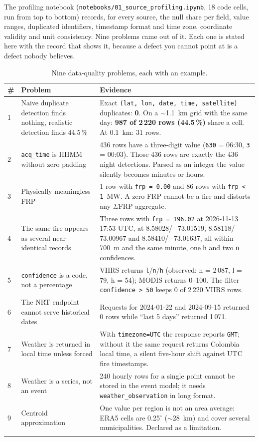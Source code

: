 \documentclass[11pt,a4paper]{article}
\newcommand{\code}[1]{\texttt{\small #1}}
\begin{document}
The profiling notebook (\code{notebooks/01\_source\_profiling.ipynb}, 18 code cells, run from top to
bottom) records, for every source, the null share per field, value ranges, duplicated identifiers,
timestamp format and time zone, coordinate validity and unit consistency. Nine problems came out of
it. Each one is stated here with the record that shows it, because a defect you cannot point at is a
defect nobody believes.

\begin{longtable}{L{0.6cm}L{4.6cm}L{10.2cm}}
\toprule
\textbf{\#} & \textbf{Problem} & \textbf{Evidence} \\
\midrule
{} & Naive duplicate detection finds nothing, realistic detection finds 44.5\,\% & Exact \code{(lat, lon, date, time, satellite)} duplicates: \textbf{0}. On a $\sim$1.1~km grid with the same day: \textbf{987 of 2\,220 rows (44.5\,\%)} share a cell. At 0.1~km: 31 rows. \\
2 & \code{acq\_time} is HHMM without zero padding & 436 rows have a three-digit value (\code{630} = 06:30, \code{3} = 00:03). Those 436 rows are exactly the 436 night detections. Parsed as an integer the value silently becomes minutes or hours. \\
3 & Physically meaningless FRP & 1 row with \code{frp = 0.00} and 86 rows with \code{frp < 1}~MW. A zero FRP cannot be a fire and distorts any $\Sigma$FRP aggregate. \\
4 & The same fire appears as several near-identical records & Three rows with \code{frp = 196.02} at 2026-11-13 17:53 UTC, at 8.58028/$-$73.01519, 8.58118/$-$73.00967 and 8.58410/$-$73.01637, all within 700~m and the same minute, one \code{h} and two \code{n} confidences. \\
5 & \code{confidence} is a code, not a percentage & VIIRS returns \code{l}/\code{n}/\code{h} (observed: n = 2\,087, l = 79, h = 54); MODIS returns 0--100. The filter \code{confidence > 50} keeps 0 of 2\,220 VIIRS rows. \\
6 & The NRT endpoint cannot serve historical dates & Requests for 2024-01-22 and 2024-09-15 returned 0 rows while ``last 5 days'' returned 1\,071. \\
7 & Weather is returned in local time unless forced & With \code{timezone=UTC} the response reports \code{GMT}; without it the same request returns Colombia local time, a silent five-hour shift against UTC fire timestamps. \\
8 & Weather is a series, not an event & 240 hourly rows for a single point cannot be stored in the event model; it needs \code{weather\_observation} in long format. \\
9 & Centroid approximation & One value per region is not an area average: ERA5 cells are 0.25$^\circ$ ($\sim$28~km) and cover several municipalities. Declared as a limitation. \\
\bottomrule
\caption{Nine data-quality problems, each with an example.}
\end{longtable}
\end{document}
